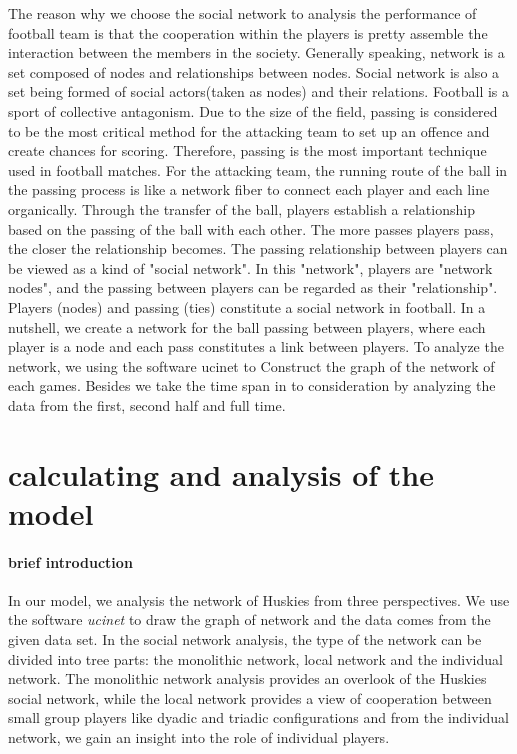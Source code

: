 \documentclass{mcmthesis}
\begin{document}
The reason why we choose the social network to analysis the performance of 
football team is that the cooperation within the players is pretty
assemble the interaction between the members in the society.
Generally speaking, network is a set composed of nodes and relationships between nodes.
Social network is also a set being formed of social actors(taken as nodes) and their relations.
Football is a sport of collective antagonism. Due to the size of the field, passing is considered 
to be the most critical method for the attacking team to set up an offence and create chances 
for scoring. Therefore, passing is the most important technique used in football matches.
For the attacking team, the running route of the ball in the passing process is like a 
network fiber to connect each player and each line organically. Through the transfer of 
the ball, players establish a relationship based on the passing of the ball with each other. 
The more passes players pass, the closer the relationship becomes. The 
passing relationship between players can be viewed as a kind of "social network". 
In this "network", players are "network nodes", and the passing between players 
can be regarded as their "relationship". Players (nodes) and passing (ties) 
constitute a social network in football.  
In a nutshell, we create a network for the ball passing between players, where each 
player is a node and each pass constitutes a link between
players. To analyze the network, we using the software ucinet to Construct
the graph of the network of each games. Besides we take the time span in to
consideration by analyzing the data from the first, second half and full time.   


\section{calculating and analysis of the model}
\paragraph{\textbf{brief introduction}}
In our model, we analysis the network of Huskies from three perspectives. We use the
software \textit{ucinet} to draw the graph of network and the data comes from the 
given data set.
In the social network analysis, the type of the network can be divided into tree parts:
the monolithic network, local network and the individual network. The monolithic network analysis
provides an overlook of the Huskies social network, while the local network provides a view of
cooperation between small group players like dyadic and triadic configurations and from the individual
network, we gain an insight into the role of individual players.
\end{document}
